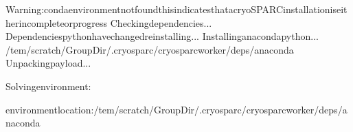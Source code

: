 \documentclass[a4paper,11pt,english]{sphinxmanual}
\begin{document}
\begin{sphinxVerbatim}[commandchars=\\\{\}]
Warning:condaenvironmentnotfoundthisindicatesthatacryoSPARCinstallationiseitherincompleteorprogress
Checkingdependencies...
Dependenciespythonhavechanged\PYGZhy{}reinstalling...
\PYGZhy{}\PYGZhy{}\PYGZhy{}\PYGZhy{}\PYGZhy{}\PYGZhy{}\PYGZhy{}\PYGZhy{}\PYGZhy{}\PYGZhy{}\PYGZhy{}\PYGZhy{}\PYGZhy{}\PYGZhy{}\PYGZhy{}\PYGZhy{}\PYGZhy{}\PYGZhy{}\PYGZhy{}\PYGZhy{}\PYGZhy{}\PYGZhy{}\PYGZhy{}\PYGZhy{}\PYGZhy{}\PYGZhy{}\PYGZhy{}\PYGZhy{}\PYGZhy{}\PYGZhy{}\PYGZhy{}\PYGZhy{}\PYGZhy{}\PYGZhy{}\PYGZhy{}\PYGZhy{}\PYGZhy{}\PYGZhy{}\PYGZhy{}\PYGZhy{}\PYGZhy{}\PYGZhy{}\PYGZhy{}\PYGZhy{}\PYGZhy{}\PYGZhy{}\PYGZhy{}\PYGZhy{}\PYGZhy{}\PYGZhy{}\PYGZhy{}\PYGZhy{}\PYGZhy{}\PYGZhy{}\PYGZhy{}\PYGZhy{}\PYGZhy{}\PYGZhy{}\PYGZhy{}\PYGZhy{}\PYGZhy{}\PYGZhy{}\PYGZhy{}\PYGZhy{}\PYGZhy{}\PYGZhy{}\PYGZhy{}\PYGZhy{}\PYGZhy{}\PYGZhy{}\PYGZhy{}\PYGZhy{}
Installinganacondapython...
\PYGZhy{}\PYGZhy{}\PYGZhy{}\PYGZhy{}\PYGZhy{}\PYGZhy{}\PYGZhy{}\PYGZhy{}\PYGZhy{}\PYGZhy{}\PYGZhy{}\PYGZhy{}\PYGZhy{}\PYGZhy{}\PYGZhy{}\PYGZhy{}\PYGZhy{}\PYGZhy{}\PYGZhy{}\PYGZhy{}\PYGZhy{}\PYGZhy{}\PYGZhy{}\PYGZhy{}\PYGZhy{}\PYGZhy{}\PYGZhy{}\PYGZhy{}\PYGZhy{}\PYGZhy{}\PYGZhy{}\PYGZhy{}\PYGZhy{}\PYGZhy{}\PYGZhy{}\PYGZhy{}\PYGZhy{}\PYGZhy{}\PYGZhy{}\PYGZhy{}\PYGZhy{}\PYGZhy{}\PYGZhy{}\PYGZhy{}\PYGZhy{}\PYGZhy{}\PYGZhy{}\PYGZhy{}\PYGZhy{}\PYGZhy{}\PYGZhy{}\PYGZhy{}\PYGZhy{}\PYGZhy{}\PYGZhy{}\PYGZhy{}\PYGZhy{}\PYGZhy{}\PYGZhy{}\PYGZhy{}\PYGZhy{}\PYGZhy{}\PYGZhy{}\PYGZhy{}\PYGZhy{}\PYGZhy{}\PYGZhy{}\PYGZhy{}\PYGZhy{}\PYGZhy{}\PYGZhy{}\PYGZhy{}
/tem/scratch/\PYGZlt{}GroupDir\PYGZgt{}/.cryosparc/cryosparc\PYGZus{}worker/deps/anaconda
Unpackingpayload...

Solvingenvironment:


environmentlocation:/tem/scratch/\PYGZlt{}GroupDir\PYGZgt{}/.cryosparc/cryosparc\PYGZus{}worker/deps/anaconda


\end{sphinxVerbatim}
\end{document}
